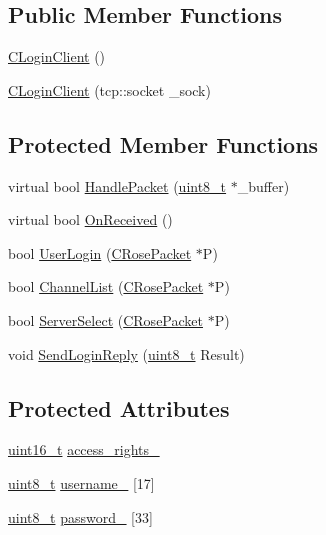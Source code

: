 \subsection*{Public Member Functions}
\begin{DoxyCompactItemize}
\item 
\hyperlink{classCLoginClient_a2d5906e8e6be7586741218d7e1654aa4}{C\+Login\+Client} ()
\item 
\hyperlink{classCLoginClient_a9d2564bbd681f8887a171423e595b33b}{C\+Login\+Client} (tcp\+::socket \+\_\+sock)
\end{DoxyCompactItemize}
\subsection*{Protected Member Functions}
\begin{DoxyCompactItemize}
\item 
virtual bool \hyperlink{classCLoginClient_ac081b7927d80954c1c84dd8cd233988e}{Handle\+Packet} (\hyperlink{stdint_8h_aba7bc1797add20fe3efdf37ced1182c5}{uint8\+\_\+t} $\ast$\+\_\+buffer)
\item 
virtual bool \hyperlink{classCLoginClient_ab5db56bf61fcc302a57f172213eb6dea}{On\+Received} ()
\item 
bool \hyperlink{classCLoginClient_a8bb96e780399576e63f4fa40d726179b}{User\+Login} (\hyperlink{structCRosePacket}{C\+Rose\+Packet} $\ast$P)
\item 
bool \hyperlink{classCLoginClient_aee4d56bef943f6dbd2978c735e394c90}{Channel\+List} (\hyperlink{structCRosePacket}{C\+Rose\+Packet} $\ast$P)
\item 
bool \hyperlink{classCLoginClient_af9a73e5c18de872bc48a6fc32bede669}{Server\+Select} (\hyperlink{structCRosePacket}{C\+Rose\+Packet} $\ast$P)
\item 
void \hyperlink{classCLoginClient_a96cd39b6672010bdd2f3ebf8a4eff601}{Send\+Login\+Reply} (\hyperlink{stdint_8h_aba7bc1797add20fe3efdf37ced1182c5}{uint8\+\_\+t} Result)
\end{DoxyCompactItemize}
\subsection*{Protected Attributes}
\begin{DoxyCompactItemize}
\item 
\hyperlink{stdint_8h_a273cf69d639a59973b6019625df33e30}{uint16\+\_\+t} \hyperlink{classCLoginClient_a741464bea0292576c3080f9666aff921}{access\+\_\+rights\+\_\+}
\item 
\hyperlink{stdint_8h_aba7bc1797add20fe3efdf37ced1182c5}{uint8\+\_\+t} \hyperlink{classCLoginClient_a5588c992cfae4c522ae032e268d63443}{username\+\_\+} \mbox{[}17\mbox{]}
\item 
\hyperlink{stdint_8h_aba7bc1797add20fe3efdf37ced1182c5}{uint8\+\_\+t} \hyperlink{classCLoginClient_ae5e1619291b95ab70a2e0e32a70f9b2e}{password\+\_\+} \mbox{[}33\mbox{]}
\end{DoxyCompactItemize}



